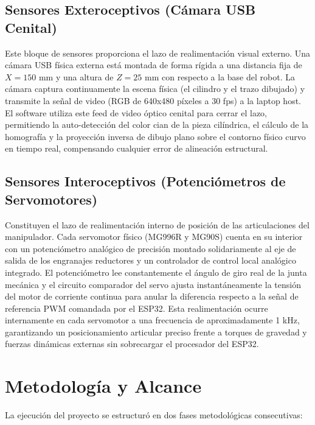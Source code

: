 \documentclass[conference,a4paper]{IEEEtran}
\begin{document}
\subsection{Sensores Exteroceptivos (Cámara USB Cenital)}
Este bloque de sensores proporciona el lazo de realimentación visual externo. Una cámara USB física externa está montada de forma rígida a una distancia fija de $X = 150\text{ mm}$ y una altura de $Z = 25\text{ mm}$ con respecto a la base del robot. La cámara captura continuamente la escena física (el cilindro y el trazo dibujado) y transmite la señal de video (RGB de 640x480 píxeles a 30 fps) a la laptop host. El software utiliza este feed de video óptico cenital para cerrar el lazo, permitiendo la auto-detección del color cian de la pieza cilíndrica, el cálculo de la homografía y la proyección inversa de dibujo plano sobre el contorno físico curvo en tiempo real, compensando cualquier error de alineación estructural.

\subsection{Sensores Interoceptivos (Potenciómetros de Servomotores)}
Constituyen el lazo de realimentación interno de posición de las articulaciones del manipulador. Cada servomotor físico (MG996R y MG90S) cuenta en su interior con un potenciómetro analógico de precisión montado solidariamente al eje de salida de los engranajes reductores y un controlador de control local analógico integrado. El potenciómetro lee constantemente el ángulo de giro real de la junta mecánica y el circuito comparador del servo ajusta instantáneamente la tensión del motor de corriente continua para anular la diferencia respecto a la señal de referencia PWM comandada por el ESP32. Esta realimentación ocurre internamente en cada servomotor a una frecuencia de aproximadamente 1 kHz, garantizando un posicionamiento articular preciso frente a torques de gravedad y fuerzas dinámicas externas sin sobrecargar el procesador del ESP32.



\section{Metodología y Alcance}
La ejecución del proyecto se estructuró en dos fases metodológicas consecutivas:
\end{document}
